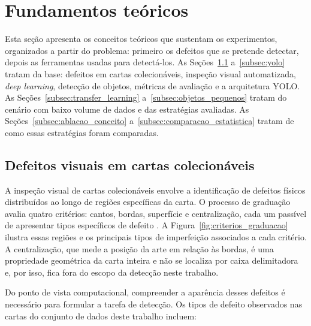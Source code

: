 \documentclass[
    12pt,                %
    openright,           %
    oneside,             %
    a4paper,             %
    english,             %
    brazil               %
]{abntex2}
\begin{document}
\section{Fundamentos teóricos}
\label{sec:fundamentos}
\label{sec:referencial}

Esta seção apresenta os conceitos teóricos que sustentam os
experimentos, organizados a partir do problema: primeiro os defeitos
que se pretende detectar, depois as ferramentas usadas para detectá-los. As
Seções~\ref{subsec:defeitos_visuais} a~\ref{subsec:yolo} tratam da base:
defeitos em cartas colecionáveis, inspeção visual automatizada,
\textit{deep learning}, detecção de objetos, métricas de avaliação e a
arquitetura YOLO. As Seções~\ref{subsec:transfer_learning}
a~\ref{subsec:objetos_pequenos} tratam do cenário com baixo volume de
dados e das estratégias avaliadas. As Seções~\ref{subsec:ablacao_conceito}
a~\ref{subsec:comparacao_estatistica} tratam de como essas estratégias
foram comparadas.

\subsection{Defeitos visuais em cartas colecionáveis}
\label{subsec:defeitos_visuais}

A inspeção visual de cartas colecionáveis envolve a identificação
de defeitos físicos distribuídos ao longo de regiões específicas
da carta. O processo de graduação avalia quatro critérios:
cantos, bordas, superfície e centralização,
cada um passível de apresentar tipos específicos de defeito 
\cite{Nahar2025}. A Figura~\ref{fig:criterios_graduacao} 
ilustra essas regiões e os principais tipos de imperfeição
associados a cada critério. A centralização, que mede a posição da arte
em relação às bordas, é uma propriedade geométrica da carta inteira e
não se localiza por caixa delimitadora e, por isso, fica fora do escopo
da detecção neste trabalho.

Do ponto de vista computacional, compreender a aparência desses
defeitos é necessário para formular a tarefa de detecção. Os tipos de
defeito observados nas cartas do conjunto de dados deste trabalho
incluem:
\end{document}
